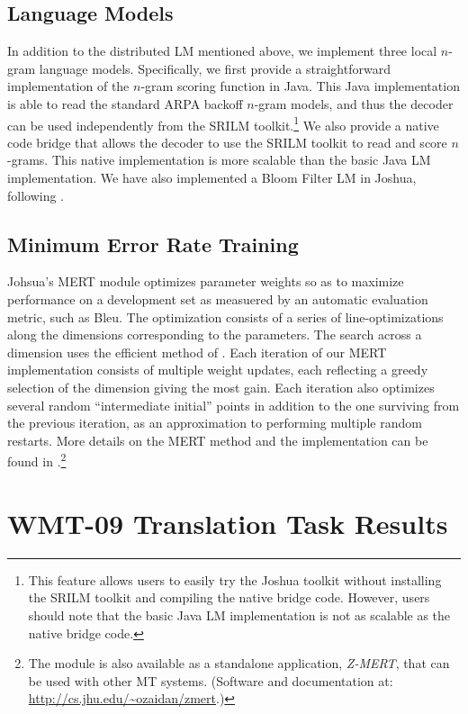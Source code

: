 \documentclass[11pt]{article}
\begin{document}
\subsection{Language Models}
In addition to the distributed LM mentioned above, we implement three local $n$-gram language models. Specifically, we first provide a straightforward implementation of the $n$-gram scoring function in Java. This Java implementation is able to read the standard ARPA backoff $n$-gram models, and thus the decoder can be used independently from the SRILM toolkit.\footnote{This feature allows users to easily try the Joshua toolkit without installing the SRILM toolkit and compiling the native bridge code. However, users should note that the basic Java LM implementation is not as scalable as the native bridge code.} We also provide a native code bridge that allows the decoder to use the SRILM toolkit to read and score $n$-grams. This native implementation is more scalable than the basic Java LM implementation. We have also implemented a Bloom Filter LM in Joshua, following .

\subsection{Minimum Error Rate Training}

Johsua's MERT module optimizes parameter weights so as to maximize performance on a development set as measuered by an automatic evaluation metric, such as Bleu. The optimization consists of a series of line-optimizations along the dimensions corresponding to the parameters. The search across a dimension uses the efficient method of . Each iteration of our MERT implementation consists of multiple weight updates, each reflecting a greedy selection of the dimension giving the most gain. Each iteration also optimizes several random ``intermediate initial'' points in addition to the one surviving from the previous iteration, as an approximation to performing multiple random restarts. More details on the MERT method and the implementation can be found in .\footnote{The module is also available as a standalone application, {\em Z-MERT}, that can be used with other MT systems. (Software and documentation at: \url{http://cs.jhu.edu/~ozaidan/zmert}.)}



\section{WMT-09 Translation Task Results}
\end{document}
